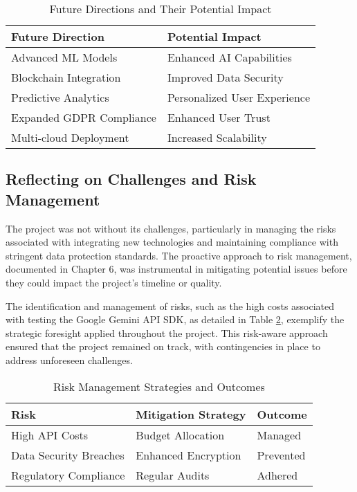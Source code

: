 \begin{table}[h]
    \centering
    \begin{tabular}{|l|l|}
        \hline
        \textbf{Future Direction} & \textbf{Potential Impact} \\ \hline
        Advanced ML Models & Enhanced AI Capabilities \\ \hline
        Blockchain Integration & Improved Data Security \\ \hline
        Predictive Analytics & Personalized User Experience \\ \hline
        Expanded GDPR Compliance & Enhanced User Trust \\ \hline
        Multi-cloud Deployment & Increased Scalability \\ \hline
    \end{tabular}
    \caption{Future Directions and Their Potential Impact}
    \label{tab:future_directions}
\end{table}

\subsection{Reflecting on Challenges and Risk Management}
The project was not without its challenges, particularly in managing the risks associated with integrating new technologies and maintaining compliance with stringent data protection standards. The proactive approach to risk management, documented in Chapter 6, was instrumental in mitigating potential issues before they could impact the project's timeline or quality.

The identification and management of risks, such as the high costs associated with testing the \gls{Google} \gls{Gemini} \gls{API} SDK, as detailed in Table \ref{tab:risk_management}, exemplify the strategic foresight applied throughout the project. This risk-aware approach ensured that the project remained on track, with contingencies in place to address unforeseen challenges.

\begin{table}[h]
    \centering
    \begin{tabular}{|l|l|l|}
        \hline
        \textbf{Risk} & \textbf{Mitigation Strategy} & \textbf{Outcome} \\ \hline
        High API Costs & Budget Allocation & Managed \\ \hline
        Data Security Breaches & Enhanced Encryption & Prevented \\ \hline
        Regulatory Compliance & Regular Audits & Adhered \\ \hline
    \end{tabular}
    \caption{Risk Management Strategies and Outcomes}
    \label{tab:risk_management}
\end{table}

